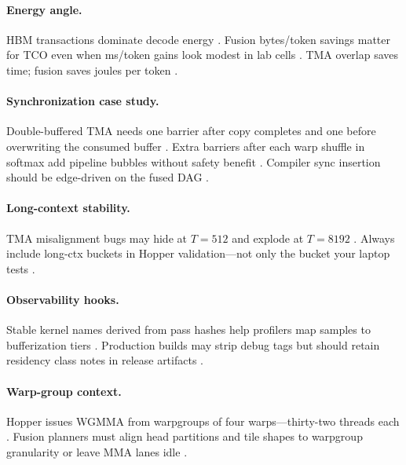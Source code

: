 \paragraph{Energy angle.}
HBM transactions dominate decode energy \citep{memoryfloor2026,patel2025llminference}.
Fusion bytes/token savings matter for TCO even when ms/token gains look modest in lab cells \citep{taxbreak2026,amd2024xdna}.
TMA overlap saves time; fusion saves joules per token \citep{semianalysis2024tma,memoryfloor2026}.

\paragraph{Synchronization case study.}
Double-buffered TMA needs one barrier after copy completes and one before overwriting the consumed buffer \citep{semianalysis2024tma,yirage2026,nvidia2022hopper}.
Extra barriers after each warp shuffle in softmax add pipeline bubbles without safety benefit \citep{dao2022flashattention,dlbook}.
Compiler sync insertion should be edge-driven on the fused DAG \citep{chen2020compilerbasedhardw,yirage2026}.

\paragraph{Long-context stability.}
TMA misalignment bugs may hide at $T{=}512$ and explode at $T{=}8192$ \citep{dao2023flashdecoding,patel2025llminference}.
Always include long-ctx buckets in Hopper validation---not only the bucket your laptop tests \citep{kwon2023vllm,yirage2026}.

\paragraph{Observability hooks.}
Stable kernel names derived from pass hashes help profilers map samples to bufferization tiers \citep{yirage2026,chen2020compilerbasedhardw,patel2025llminference}.
Production builds may strip debug tags but should retain residency class notes in release artifacts \citep{taxbreak2026,memoryfloor2026}.

\paragraph{Warp-group context.}
Hopper issues WGMMA from warpgroups of four warps---thirty-two threads each \citep{shah2024flashattention3,nvidia2022hopper}.
Fusion planners must align head partitions and tile shapes to warpgroup granularity or leave MMA lanes idle \citep{dao2022flashattention,yirage2026,patel2025llminference}.

